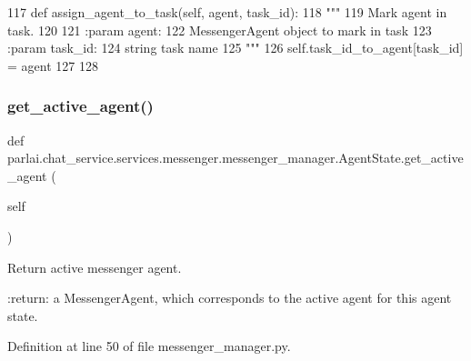 \begin{DoxyCode}
117     \textcolor{keyword}{def }assign\_agent\_to\_task(self, agent, task\_id):
118         \textcolor{stringliteral}{"""}
119 \textcolor{stringliteral}{        Mark agent in task.}
120 \textcolor{stringliteral}{}
121 \textcolor{stringliteral}{        :param agent:}
122 \textcolor{stringliteral}{            MessengerAgent object to mark in task}
123 \textcolor{stringliteral}{        :param task\_id:}
124 \textcolor{stringliteral}{            string task name}
125 \textcolor{stringliteral}{        """}
126         self.task\_id\_to\_agent[task\_id] = agent
127 
128 
\end{DoxyCode}
\mbox{\label{classparlai_1_1chat__service_1_1services_1_1messenger_1_1messenger__manager_1_1AgentState_a487258dba5d31c303dc4f09d6261aea6}} 
\subsubsection{\texorpdfstring{get\+\_\+active\+\_\+agent()}{get\_active\_agent()}}
{\footnotesize\ttfamily def parlai.\+chat\+\_\+service.\+services.\+messenger.\+messenger\+\_\+manager.\+Agent\+State.\+get\+\_\+active\+\_\+agent (\begin{DoxyParamCaption}\item[{}]{self }\end{DoxyParamCaption})}

\begin{DoxyVerb}Return active messenger agent.

:return:
    a MessengerAgent, which corresponds to the active agent for this
    agent state.
\end{DoxyVerb}
 

Definition at line 50 of file messenger\+\_\+manager.\+py.


